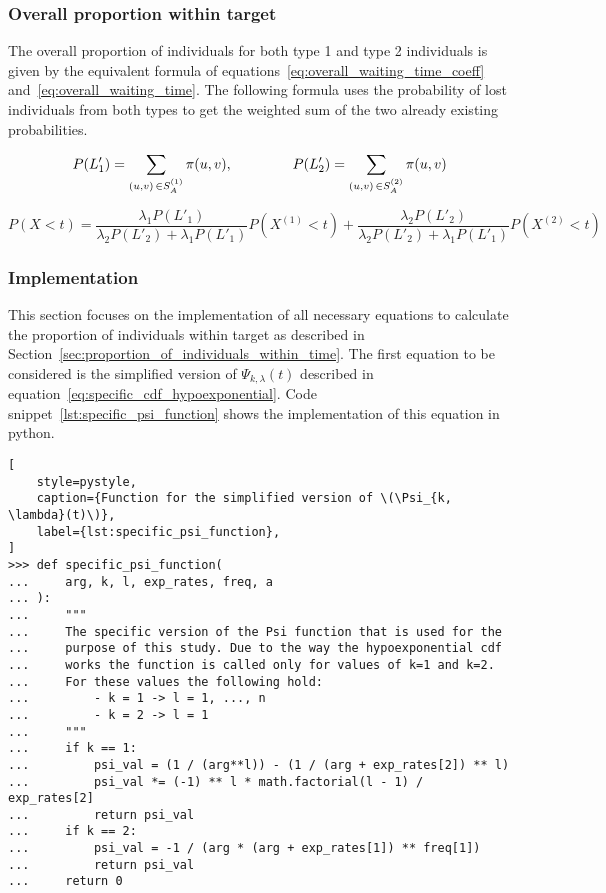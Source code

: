 \subsubsection{Overall proportion within target}

The overall proportion of individuals for both type 1 and type 2 individuals
is given by the equivalent formula of
equations~\eqref{eq:overall_waiting_time_coeff}
and~\eqref{eq:overall_waiting_time}.
The following formula uses the probability of lost individuals from both types
to get the weighted sum of the two already existing probabilities.

\begin{equation*}
    P(L'_1) = \sum_{(u,v) \, \in S_A^{(1)}} \pi(u,v), \hspace{1.5cm}
    P(L'_2) = \sum_{(u,v) \, \in S_A^{(2)}} \pi(u,v)
\end{equation*}

\small
\begin{equation}\label{eq:overall_proportion_within_target}
    P(X < t)= \frac{\lambda_1 P(L'_1)}{\lambda_2 P(L'_2)+\lambda_1 P(L'_1)}
    P(X^{(1)} < t) + \frac{\lambda_2 P(L'_2)}{\lambda_2 P(L'_2) + \lambda_1
    P(L'_1)} P(X^{(2)} < t)
\end{equation}
\normalsize

\subsubsection{Implementation}\label{sec:implementation_proportion_individuals}

This section focuses on the implementation of all necessary equations to 
calculate the proportion of individuals within target as described
in Section~\ref{sec:proportion_of_individuals_within_time}.
The first equation to be considered is the simplified version of
\(\Psi_{k, \lambda}(t)\) described in
equation~\eqref{eq:specific_cdf_hypoexponential}.
Code snippet~\ref{lst:specific_psi_function} shows the implementation of this
equation in python.

\begin{lstlisting}[
    style=pystyle,
    caption={Function for the simplified version of \(\Psi_{k, \lambda}(t)\)},
    label={lst:specific_psi_function},
]
>>> def specific_psi_function(
...     arg, k, l, exp_rates, freq, a
... ):
...     """
...     The specific version of the Psi function that is used for the
...     purpose of this study. Due to the way the hypoexponential cdf
...     works the function is called only for values of k=1 and k=2. 
...     For these values the following hold:
...         - k = 1 -> l = 1, ..., n
...         - k = 2 -> l = 1
...     """
...     if k == 1:
...         psi_val = (1 / (arg**l)) - (1 / (arg + exp_rates[2]) ** l)
...         psi_val *= (-1) ** l * math.factorial(l - 1) / exp_rates[2]
...         return psi_val
...     if k == 2:
...         psi_val = -1 / (arg * (arg + exp_rates[1]) ** freq[1])
...         return psi_val
...     return 0

\end{lstlisting}

